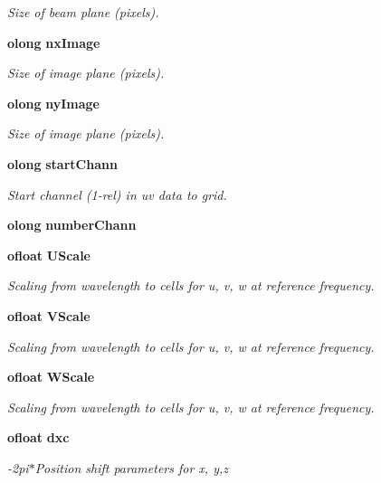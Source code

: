 \begin{CompactItemize}
\begin{CompactList}\small\item\em Size of beam plane (pixels). \item\end{CompactList}\item 
{\bf olong} {\bf nx\-Image}
\begin{CompactList}\small\item\em Size of image plane (pixels). \item\end{CompactList}\item 
{\bf olong} {\bf ny\-Image}
\begin{CompactList}\small\item\em Size of image plane (pixels). \item\end{CompactList}\item 
{\bf olong} {\bf start\-Chann}
\begin{CompactList}\small\item\em Start channel (1-rel) in uv data to grid. \item\end{CompactList}\item 
{\bf olong} {\bf number\-Chann}
\item 
{\bf ofloat} {\bf UScale}
\begin{CompactList}\small\item\em Scaling from wavelength to cells for u, v, w at reference frequency. \item\end{CompactList}\item 
{\bf ofloat} {\bf VScale}
\begin{CompactList}\small\item\em Scaling from wavelength to cells for u, v, w at reference frequency. \item\end{CompactList}\item 
{\bf ofloat} {\bf WScale}
\begin{CompactList}\small\item\em Scaling from wavelength to cells for u, v, w at reference frequency. \item\end{CompactList}\item 
{\bf ofloat} {\bf dxc}
\begin{CompactList}\small\item\em -2pi$\ast$Position shift parameters for x, y,z \item\end{CompactList}\item 

\end{CompactItemize}
